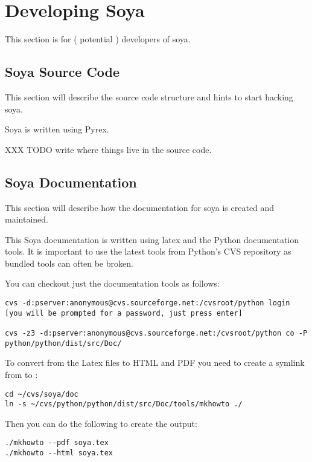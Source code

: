 \section{Developing Soya}

This section is for ( potential ) developers of soya.

\subsection{Soya Source Code}
This section will describe the source code structure and hints to start 
hacking soya. 

Soya is written using Pyrex.

XXX TODO write where things live in the source code. 

\begin{seealso}
\end{seealso}


\subsection{Soya Documentation}
This section will describe how the documentation for soya is created and
maintained. 

This Soya documentation is written using latex and the Python documentation 
tools. It is important to use the latest tools from Python's CVS repository
as bundled tools can often be broken. 

You can checkout just the documentation tools as follows:
\begin{verbatim}
cvs -d:pserver:anonymous@cvs.sourceforge.net:/cvsroot/python login 
[you will be prompted for a password, just press enter]

cvs -z3 -d:pserver:anonymous@cvs.sourceforge.net:/cvsroot/python co -P python/python/dist/src/Doc/
\end{verbatim}

To convert from the Latex files to HTML and PDF you need to create a symlink 
from  to 
:
\begin{verbatim}
cd ~/cvs/soya/doc
ln -s ~/cvs/python/python/dist/src/Doc/tools/mkhowto ./
\end{verbatim}

Then you can do the following to create the output:
\begin{verbatim}
./mkhowto --pdf soya.tex
./mkhowto --html soya.tex
\end{verbatim}


